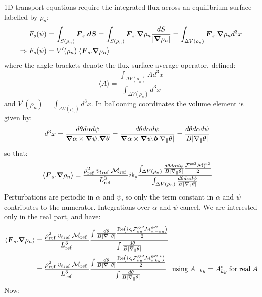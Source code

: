 \documentclass[10pt,a4paper]{article}
\newcommand{\grad}{{\bfm \nabla}}
\newcommand{\bfm}[1]{\mbox{{\boldmath $ { #1}$}}}
\newcommand{\gradpar}{\nabla_{\parallel}}
\newcommand{\n}[1]{{#1}_{\rm ref\;}}
\newcommand{\g}[1]{\mathsf{#1}}
\renewcommand{\Re}[1]{{\rm Re}\left( #1 \right)}
\begin{document}
1D transport equations require the integrated flux across an equilibrium
surface labelled by $\rho_n$:
\begin{align*}
  F_s(\psi) & = \int_{S(\rho_n)} \bfm{F}_s . \bfm{dS} = \int_{S(\rho_n)}
  \bfm{F}_s.\grad{\rho_n} \frac{dS}{|\grad \rho_n|} = \int_{\Delta V(\rho_n)}
  \bfm{F}_s.\grad{\rho_n} d^3x \\
  \Rightarrow F_s(\psi) & = V^{\prime}(\rho_n) \; \langle
  \bfm{F}_s.\grad{\rho_n} \rangle
\end{align*}
where the angle brackets denote the flux surface average operator, defined:
\[ \langle A \rangle = \frac{\int_{\Delta V(\rho_n)} A d^3x}{\int_{\Delta
    V(\rho_n)} d^3x} \] and $V^{\prime}(\rho_n) = \int_{\Delta V(\rho_n)}
d^3x$. In ballooning coordinates the volume element is given by:
\begin{align*}
  d^3x & = \frac{d\theta d\alpha d\psi}{\grad \alpha \times \grad \psi.\grad
    \theta} = \frac{d\theta d\alpha d\psi}{\grad \alpha \times \grad
    \psi.\bfm{b} |\gradpar \theta|} = \frac{d\theta d\alpha d\psi}{B |\gradpar
    \theta|}
\end{align*}
so that:
\begin{align*}
  \langle \bfm{F}_s.\grad{\rho_n} \rangle & = \frac{\n{\rho}^2 \n{v_t} \n{\cal
      M}}{\n{L}^3 } i \g{k_y} \frac{\int_{\Delta V(\rho_n)} \frac{d\theta
      d\alpha d\psi}{B |\gradpar \theta|} \frac{ {\cal F}^{\rm gs2} {\cal
        M}_s^{\rm gs2} }{2}}{\int_{\Delta V(\rho_n)} \frac{d\theta d\alpha
      d\psi}{B |\gradpar \theta|}}
\end{align*}
Perturbations are periodic in $\alpha$ and $\psi$, so only the term constant
in $\alpha$ and $\psi$ contributes to the numerator. Integrations over
$\alpha$ and $\psi$ cancel.  We are interested only in the real part, and
have:
\begin{align*}
  \langle \bfm{F}_s.\grad{\rho_n} \rangle & = \frac{\n{\rho}^2 \n{v_t} \n{\cal
      M}}{\n{L}^3 } \frac{\int \frac{d\theta}{B |\gradpar \theta|} \frac{ \Re{
        i \g{k_y} {\cal F}^{\rm gs2}_{ky} {\cal M}_{s,-ky}^{\rm gs2}}
    }{2}}{\int \frac{d\theta}{B |\gradpar \theta|}} \\
  & = \frac{\n{\rho}^2 \n{v_t} \n{\cal M}}{\n{L}^3 } \frac{\int
    \frac{d\theta}{B |\gradpar \theta|} \frac{ \Re{ i \g{k_y} {\cal F}^{\rm
          gs2}_{ky} {\cal M}_{s,ky}^{\rm gs2 \;\ast} }}{2}}{\int
    \frac{d\theta}{B |\gradpar \theta|}} \;\;\; {\rm using} \; A_{-ky} =
  A_{ky}^{\ast} \; {\rm for \; real \;} A
\end{align*}
Now:
\end{document}
